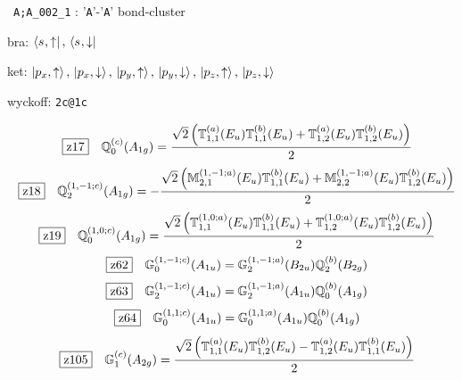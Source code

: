 \documentclass[fleqn,10pt,landscape]{jsarticle}
\begin{document}
\noindent\textbullet\, \texttt{A;A_002_1} : '\texttt{A}'-'\texttt{A}' bond-cluster

\noindent\quad * bra: $\bra{s_{},\uparrow},\, \bra{s_{},\downarrow}$

\noindent\quad * ket: $\ket{p_{x},\uparrow},\, \ket{p_{x},\downarrow},\, \ket{p_{y},\uparrow},\, \ket{p_{y},\downarrow},\, \ket{p_{z},\uparrow},\, \ket{p_{z},\downarrow}$

\noindent\quad * wyckoff: \texttt{2c@1c}

\begin{dmath*}
\hspace*{3mm}\fbox{z17}\quad \mathbb{Q}_{0}^{(c)}(A_{1g})=\frac{\sqrt{2} \left(\mathbb{T}_{1,1}^{(a)}(E_{u}) \mathbb{T}_{1,1}^{(b)}(E_{u}) + \mathbb{T}_{1,2}^{(a)}(E_{u}) \mathbb{T}_{1,2}^{(b)}(E_{u})\right)}{2}
\end{dmath*}
\begin{dmath*}
\hspace*{3mm}\fbox{z18}\quad \mathbb{Q}_{2}^{(1,-1;c)}(A_{1g})=- \frac{\sqrt{2} \left(\mathbb{M}_{2,1}^{(1,-1;a)}(E_{u}) \mathbb{T}_{1,1}^{(b)}(E_{u}) + \mathbb{M}_{2,2}^{(1,-1;a)}(E_{u}) \mathbb{T}_{1,2}^{(b)}(E_{u})\right)}{2}
\end{dmath*}
\begin{dmath*}
\hspace*{3mm}\fbox{z19}\quad \mathbb{Q}_{0}^{(1,0;c)}(A_{1g})=\frac{\sqrt{2} \left(\mathbb{T}_{1,1}^{(1,0;a)}(E_{u}) \mathbb{T}_{1,1}^{(b)}(E_{u}) + \mathbb{T}_{1,2}^{(1,0;a)}(E_{u}) \mathbb{T}_{1,2}^{(b)}(E_{u})\right)}{2}
\end{dmath*}
\begin{dmath*}
\hspace*{3mm}\fbox{z62}\quad \mathbb{G}_{0}^{(1,-1;c)}(A_{1u})=\mathbb{G}_{2}^{(1,-1;a)}(B_{2u}) \mathbb{Q}_{2}^{(b)}(B_{2g})
\end{dmath*}
\begin{dmath*}
\hspace*{3mm}\fbox{z63}\quad \mathbb{G}_{2}^{(1,-1;c)}(A_{1u})=\mathbb{G}_{2}^{(1,-1;a)}(A_{1u}) \mathbb{Q}_{0}^{(b)}(A_{1g})
\end{dmath*}
\begin{dmath*}
\hspace*{3mm}\fbox{z64}\quad \mathbb{G}_{0}^{(1,1;c)}(A_{1u})=\mathbb{G}_{0}^{(1,1;a)}(A_{1u}) \mathbb{Q}_{0}^{(b)}(A_{1g})
\end{dmath*}
\begin{dmath*}
\hspace*{3mm}\fbox{z105}\quad \mathbb{G}_{1}^{(c)}(A_{2g})=\frac{\sqrt{2} \left(\mathbb{T}_{1,1}^{(a)}(E_{u}) \mathbb{T}_{1,2}^{(b)}(E_{u}) - \mathbb{T}_{1,2}^{(a)}(E_{u}) \mathbb{T}_{1,1}^{(b)}(E_{u})\right)}{2}
\end{dmath*}
\end{document}
